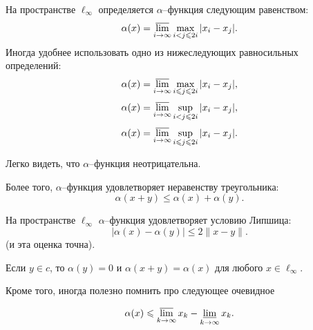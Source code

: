 На пространстве $\ell_\infty$ определяется $\alpha$--функция следующим равенством:
\begin{equation}
	\alpha(x) = \varlimsup_{i\to\infty} \max_{i<j\leqslant 2i} |x_i - x_j|
	.
\end{equation}
Иногда удобнее использовать одно из нижеследующих равносильных определений:
\begin{equation}
	\alpha(x) = \varlimsup_{i\to\infty} \max_{i \leqslant j\leqslant 2i} |x_i - x_j|
	,
\end{equation}
\begin{equation}
	\alpha(x) = \varlimsup_{i\to\infty} \sup_{i<j\leqslant 2i} |x_i - x_j|
	,
\end{equation}
\begin{equation}
	\alpha(x) = \varlimsup_{i\to\infty} \sup_{i \leqslant j\leqslant 2i} |x_i - x_j|
	.
\end{equation}

Легко видеть, что $\alpha$--функция неотрицательна.
\begin{property}
	\label{thm:alpha_x_triangle_ineq}
	Более того, $\alpha$--функция удовлетворяет неравенству треугольника:
	\begin{equation}
		\alpha(x+y) \leq \alpha(x) + \alpha(y)
		.
	\end{equation}
\end{property}

\begin{property}
	На пространстве $\ell_\infty$ $\alpha$--функция удовлетворяет условию Липшица:
	\begin{equation}\label{alpha_Lipshitz}
		|\alpha(x) - \alpha(y)| \leq 2 \|x-y\|
		.
	\end{equation}
	(и эта оценка точна).
\end{property}

\begin{property}
	Если $y\in c$, то $\alpha(y) = 0$ и $\alpha(x+y) = \alpha(x)$ для любого $x \in \ell_\infty$.
\end{property}

Кроме того, иногда полезно помнить про следующее очевидное
\begin{property}
	\label{thm:alpha_x_leq_limsup_minus_liminf}
	\begin{equation}
		\alpha(x) \leq \varlimsup_{k\to\infty} x_k - \varliminf_{k\to\infty} x_k
		.
	\end{equation}
\end{property}
